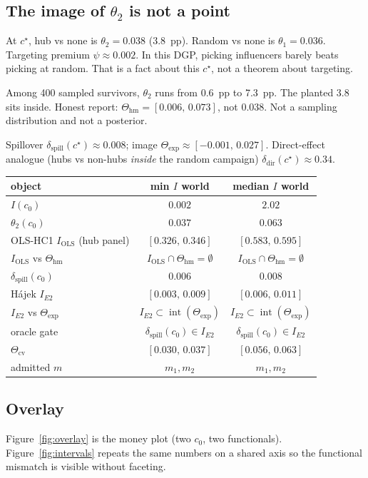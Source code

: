 \documentclass[11pt]{article}
\newcommand{\hm}{\mathrm{hm}}
\newcommand{\cv}{\mathrm{cv}}
\newcommand{\expset}{\mathrm{exp}}
\newcommand{\prem}{\psi}
\newcommand{\interior}{\operatorname{int}}
\newcommand{\Iols}{I_{\mathrm{OLS}}}
\newcommand{\Ie}{I_{E2}}
\begin{document}
\subsection{The image of $\theta_2$ is not a point}
At $c^\star$, hub vs none is $\theta_2=0.038$ (3.8~pp). Random vs none
is $\theta_1=0.036$. Targeting premium $\prem\approx 0.002$. In this
DGP, picking influencers barely beats picking at random. That is a
fact about this $c^\star$, not a theorem about targeting.

Among 400 sampled survivors, $\theta_2$ runs from 0.6~pp to 7.3~pp.
The planted 3.8 sits inside. Honest report:
$\Theta_{\hm}=[0.006,\,0.073]$, not $0.038$. Not a sampling
distribution and not a posterior.

Spillover $\delta_{\mathrm{spill}}(c^\star)\approx 0.008$; image
$\Theta_{\expset}\approx[-0.001,\,0.027]$. Direct-effect analogue
(hubs vs non-hubs \emph{inside} the random campaign)
$\delta_{\mathrm{dir}}(c^\star)\approx 0.34$.

\begin{center}
\small
\begin{tabular}{@{}lcc@{}}
\toprule
object & min $I$ world & median $I$ world \\
\midrule
$I(c_0)$ & $0.002$ & $2.02$ \\
$\theta_2(c_0)$ & $0.037$ & $0.063$ \\
OLS-HC1 $\Iols$ (hub panel) & $[0.326,\,0.346]$ & $[0.583,\,0.595]$ \\
$\Iols$ vs $\Theta_{\hm}$
  & $\Iols\cap\Theta_{\hm}=\emptyset$
  & $\Iols\cap\Theta_{\hm}=\emptyset$ \\
$\delta_{\mathrm{spill}}(c_0)$ & $0.006$ & $0.008$ \\
H\'ajek $\Ie$ & $[0.003,\,0.009]$ & $[0.006,\,0.011]$ \\
$\Ie$ vs $\Theta_{\expset}$
  & $\Ie\subset\interior(\Theta_{\expset})$
  & $\Ie\subset\interior(\Theta_{\expset})$ \\
oracle gate
  & $\delta_{\mathrm{spill}}(c_0)\in\Ie$
  & $\delta_{\mathrm{spill}}(c_0)\in\Ie$ \\
$\Theta_{\cv}$ & $[0.030,\,0.037]$ & $[0.056,\,0.063]$ \\
admitted $m$ & $m_1,m_2$ & $m_1,m_2$ \\
\bottomrule
\end{tabular}
\end{center}

\subsection{Overlay}
Figure~\ref{fig:overlay} is the money plot (two $c_0$, two functionals).
Figure~\ref{fig:intervals} repeats the same numbers on a shared axis so
the functional mismatch is visible without faceting.
\end{document}
